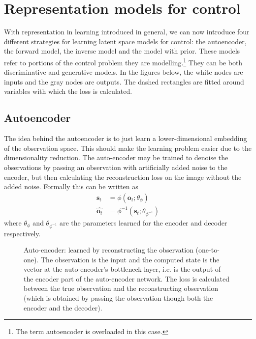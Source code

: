 

\section{Representation models for control}
\label{sec-srl-for-control}
With representation in learning introduced in general,
we can now introduce four different strategies for learning latent space models for control:
the autoencoder, the forward model, the inverse model and the model
with prior.
These models refer to portions of the control problem they are modelling.\footnote{The term
autoencoder is overloaded in this case.}
They can be both discriminative and generative models.
In the figures below, the white nodes are inputs and the gray nodes are outputs.
The dashed rectangles are fitted around variables with which the loss is calculated.

\subsection{Autoencoder}
The idea behind the autoencoder is to just learn a lower-dimensional embedding
of the observation space. This should make the learning problem easier due to the
dimensionality reduction.
The auto-encoder may be trained to denoise the observations by passing an observation
with artificially added noise to the encoder, but then calculating the reconstruction
loss on the image without the added noise.
Formally this can be written as
\begin{align}
		\bm{s}_{t} &= \phi (\bm{o}_{t}; \theta_{ \phi }) \\
		\hat{\bm{o}_{t}} &= \phi^{ -1 } (\bm{s}_{t}; \theta_{ \phi^{ -1 } })
\end{align}
where $ \theta_{ \phi }  $ and
$ \theta_{ \phi^{ -1 } }  $ are the parameters learned for the encoder and decoder respectively.

\begin{figure}[htpb]
\begin{center}
\end{center}
		\caption{Auto-encoder: learned by reconstructing the observation (one-to-one).
				The observation is the input and the computed state is the vector at
				the auto-encoder's bottleneck layer, i.e. is the output of the encoder
				part of the auto-encoder network.
		The loss is calculated between the true observation and the reconstructing observation (which
		is obtained by passing the observation though both the encoder and the decoder).}
\end{figure}

